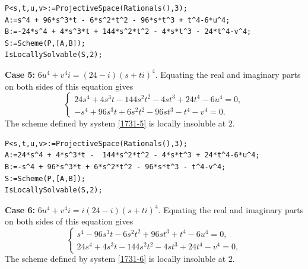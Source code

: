\documentclass[a4paper,12pt,english,reqno]{amsart}
\begin{document}
\begin{lstlisting}
P<s,t,u,v>:=ProjectiveSpace(Rationals(),3);
A:=s^4 + 96*s^3*t - 6*s^2*t^2 - 96*s*t^3 + t^4-6*u^4;
B:=-24*s^4 + 4*s^3*t + 144*s^2*t^2 - 4*s*t^3 - 24*t^4-v^4;
S:=Scheme(P,[A,B]);
IsLocallySolvable(S,2);
\end{lstlisting}

{\bf Case 5:} $6u^4+v^4i=(24-i)(s+ti)^4$. Equating the real and imaginary parts on both sides of this equation gives
\begin{equation}\label{1731-5}
\begin{cases}
24s^4 + 4s^3t - 144s^2t^2 - 4st^3 + 24t^4 - 6u^4=0,\\
-s^4 + 96s^3t + 6s^2t^2 - 96st^3 - t^4 - v^4=0.
\end{cases}
\end{equation}
The scheme defined by system \eqref{1731-5} is locally insoluble at $2$.


\begin{lstlisting}
P<s,t,u,v>:=ProjectiveSpace(Rationals(),3);
A:=24*s^4 + 4*s^3*t -  144*s^2*t^2 - 4*s*t^3 + 24*t^4-6*u^4;
B:=-s^4 + 96*s^3*t + 6*s^2*t^2 - 96*s*t^3 - t^4-v^4;
S:=Scheme(P,[A,B]);
IsLocallySolvable(S,2);
\end{lstlisting}

{\bf Case 6:} $6u^4+v^4i=i(24-i)(s+ti)^4$. Equating the real and imaginary parts on both sides of this equation gives
\begin{equation}\label{1731-6}
\begin{cases}
s^4 - 96s^3t - 6s^2t^2 + 96st^3 + t^4 - 6u^4=0,\\
24s^4 + 4s^3t - 144s^2t^2 - 4st^3 + 24t^4 - v^4=0,
\end{cases}
\end{equation}
The scheme defined by system \eqref{1731-6} is locally insoluble at $2$.

\end{document}
